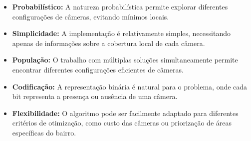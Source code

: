 \documentclass[12pt, a4paper]{report}
\begin{document}
\begin{itemize}
    \item \textbf{Probabilístico:} A natureza probabilística permite explorar diferentes configurações de câmeras, evitando mínimos locais.
    
    \item \textbf{Simplicidade:} A implementação é relativamente simples, necessitando apenas de informações sobre a cobertura local de cada câmera.
    
    \item \textbf{População:} O trabalho com múltiplas soluções simultaneamente permite encontrar diferentes configurações eficientes de câmeras.
    
    \item \textbf{Codificação:} A representação binária é natural para o problema, onde cada bit representa a presença ou ausência de uma câmera.
    
    \item \textbf{Flexibilidade:} O algoritmo pode ser facilmente adaptado para diferentes critérios de otimização, como custo das câmeras ou priorização de áreas específicas do bairro.
\end{itemize}
\end{document}
